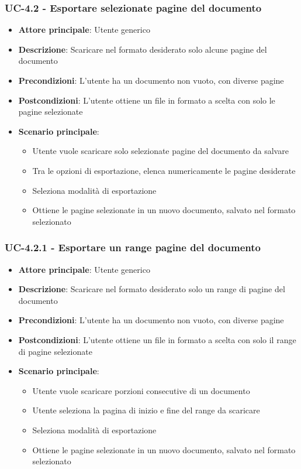 \documentclass[11pt,a4paper]{article}
\begin{document}
\subsubsection{UC-4.2 - Esportare selezionate pagine del documento}
\begin{itemize}
    \item \textbf{Attore principale}: Utente generico
    \item \textbf{Descrizione}: Scaricare nel formato desiderato solo alcune pagine del documento
    \item \textbf{Precondizioni}: L'utente ha un documento non vuoto, con diverse pagine
    \item \textbf{Postcondizioni}: L'utente ottiene un file in formato a scelta con solo le pagine selezionate
    \item \textbf{Scenario principale}:
        \begin{itemize}
            \item Utente vuole scaricare solo selezionate pagine del documento da salvare
            \item Tra le opzioni di esportazione, elenca numericamente le pagine desiderate
            \item Seleziona modalità di esportazione
            \item Ottiene le pagine selezionate in un nuovo documento, salvato nel formato selezionato
        \end{itemize}
\end{itemize}

\subsubsection{UC-4.2.1 - Esportare un range pagine del documento}
\begin{itemize}
    \item \textbf{Attore principale}: Utente generico
    \item \textbf{Descrizione}: Scaricare nel formato desiderato solo un range di pagine del documento
    \item \textbf{Precondizioni}: L'utente ha un documento non vuoto, con diverse pagine
    \item \textbf{Postcondizioni}: L'utente ottiene un file in formato a scelta con solo il range di pagine selezionate
    \item \textbf{Scenario principale}:
        \begin{itemize}
            \item Utente vuole scaricare porzioni consecutive di un documento
            \item Utente seleziona la pagina di inizio e fine del range da scaricare
            \item Seleziona modalità di esportazione
            \item Ottiene le pagine selezionate in un nuovo documento, salvato nel formato selezionato
        \end{itemize}
\end{itemize}
\end{document}
